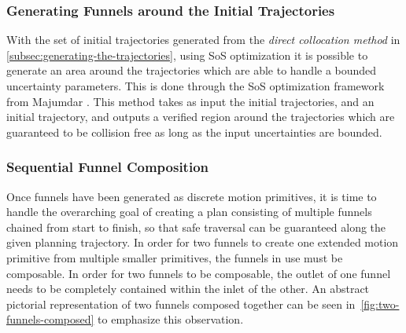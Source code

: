 \subsubsection{Generating Funnels around the Initial Trajectories}
\label{sec:generating-funnels-initial}

With the set of initial trajectories generated from the \textit{direct
  collocation method} in \ref{subsec:generating-the-trajectories}, using SoS
optimization it is possible to generate an area around the trajectories which
are able to handle a bounded uncertainty parameters. This is done through the
SoS optimization framework from Majumdar
\cite{majumdarFunnelLibrariesRealtime2017}. This method takes as input the
initial trajectories, and an initial trajectory, and outputs a verified region
around the trajectories which are guaranteed to be collision free as long as the
input uncertainties are bounded.


\subsubsection{Sequential Funnel Composition}
\label{sec:composable-funnels}


Once funnels have been generated as discrete motion primitives, it is time to
handle the overarching goal of creating a plan consisting of multiple funnels
chained from start to finish, so that safe traversal can be guaranteed along the
given planning trajectory. In order for two funnels to create one extended
motion primitive from multiple smaller primitives, the funnels in use must be
composable. In order for two funnels to be composable, the outlet of one funnel
needs to be completely contained within the inlet of the other. An abstract
pictorial representation of two funnels composed together can be seen
in~\cref{fig:two-funnels-composed} to emphasize this observation.

